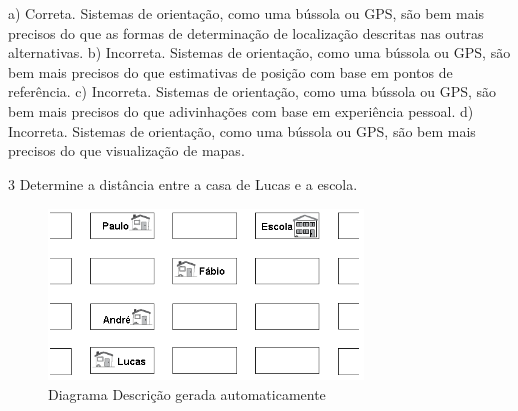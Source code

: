 \begin{escolha}
\begin{boxmedio}
\begin{boxmedio}
{\begin{boxpeq}
\begin{boxpeq}
{\begin{boxpeq}
\begin{boxmedio}
\begin{boxmedio}
\begin{boxpeq}
\begin{boxmedio}
\begin{boxpeq}
\begin{boxpeq}
\begin{boxpeq}
\begin{boxpeq}
\begin{boxmedio}
{\begin{boxmedio}
\begin{boxmedio}
\begin{boxpeq}
\begin{boxmedio}
\begin{boxpeq}
\begin{boxpeq}
\begin{boxpeq}
\begin{escolha}
{\begin{boxmedio}
\begin{boxpeq}
\begin{boxpeq}
\begin{boxpeq}
\begin{boxpeq}
\begin{boxpeq}
\begin{boxmedio}
\begin{boxpeq}
\begin{boxpeq}
\begin{boxpeq}
{\begin{boxpeq}
\begin{boxmedio}
\begin{boxpeq}
\begin{boxpeq}
\begin{boxpeq}
{\begin{boxpeq}
\begin{boxmedio}
{\begin{boxpeq}
\begin{boxpeq}
\begin{boxmedio}
\begin{boxmedio}
\begin{boxpeq}
\begin{boxpeq}
{\begin{boxpeq}
\begin{boxpeq}
\begin{boxpeq}
\begin{boxpeq}
\begin{boxpeq}
\begin{escolha}
\begin{escolha}
{\begin{boxmedio}
\begin{boxpeq}
\begin{q°}
\begin{boxmedio}
\begin{boxpeq}
\begin{boxpeq}
\begin{boxmedio}
\begin{boxmedio}
\begin{boxmedio}
{a) Correta. Sistemas de orientação, como uma bússola ou GPS, são bem mais precisos do que
as formas de determinação de localização descritas nas outras alternativas.
b) Incorreta. Sistemas de orientação, como uma bússola ou GPS, são bem mais precisos do que 
estimativas de posição com base em pontos de referência.
c) Incorreta. Sistemas de orientação, como uma bússola ou GPS, são bem mais precisos do que 
adivinhações com base em experiência pessoal.
d) Incorreta. Sistemas de orientação, como uma bússola ou GPS, são bem mais precisos do que
visualização de mapas.} 

\num{3} Determine a distância entre a casa de Lucas e a escola.

\begin{figure}
\centering
\includegraphics[width=3.29167in,height=1.79167in]{./_SAEB_9_MAT/media/image212.png}
\caption{Diagrama Descrição gerada automaticamente}
\end{figure}


\end{boxmedio}
\end{boxmedio}
\end{boxmedio}
\end{boxpeq}
\end{boxpeq}
\end{boxmedio}
\end{q°}
\end{boxpeq}
\end{boxmedio}}
\end{escolha}
\end{escolha}
\end{boxpeq}
\end{boxpeq}
\end{boxpeq}
\end{boxpeq}
\end{boxpeq}}
\end{boxpeq}
\end{boxpeq}
\end{boxmedio}
\end{boxmedio}
\end{boxpeq}
\end{boxpeq}}
\end{boxmedio}
\end{boxpeq}}
\end{boxpeq}
\end{boxpeq}
\end{boxpeq}
\end{boxmedio}
\end{boxpeq}}
\end{boxpeq}
\end{boxpeq}
\end{boxpeq}
\end{boxmedio}
\end{boxpeq}
\end{boxpeq}
\end{boxpeq}
\end{boxpeq}
\end{boxpeq}
\end{boxmedio}}
\end{escolha}
\end{boxpeq}
\end{boxpeq}
\end{boxpeq}
\end{boxmedio}
\end{boxpeq}
\end{boxmedio}
\end{boxmedio}}
\end{boxmedio}
\end{boxpeq}
\end{boxpeq}
\end{boxpeq}
\end{boxpeq}
\end{boxmedio}
\end{boxpeq}
\end{boxmedio}
\end{boxmedio}
\end{boxpeq}}
\end{boxpeq}
\end{boxpeq}}
\end{boxmedio}
\end{boxmedio}
\end{escolha}
